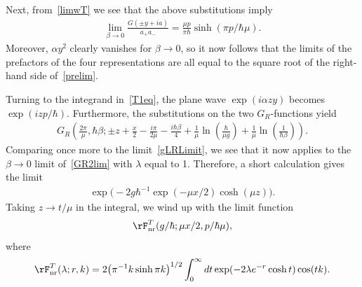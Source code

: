\documentclass[pdftex]{sigma}
\numberwithin{equation}{section}
\begin{document}
Next, from~\eqref{limwT} we see that the above substitutions imply
\begin{gather}\label{prelim}
\lim_{\beta\to 0}\frac{G(\pm y+ia)}{a_+a_-}=\frac{\mu p}{\pi\hbar}\sinh(\pi p/\hbar\mu).
\end{gather}
Moreover, $\alpha y^2$ clearly vanishes for $\beta\to 0$, so it now follows that the limits of the prefactors of the four representations are all equal to the square root of the right-hand side of~\eqref{prelim}.

Turning to the integrand in~\eqref{T1eq}, the plane wave $\exp(i\alpha zy)$ becomes $\exp(izp/\hbar)$. Furthermore, the substitutions on the two $G_R$-functions yield
\begin{gather}\label{GR2lim}
G_R\left(\frac{2\pi}{\mu},\hbar\beta;\pm z +\frac{x}{2}-\frac{i\pi}{2\mu}-\frac{i\hbar\beta}{4}+\frac{1}{\mu}\ln\left(\frac{\hbar}{\mu g}\right)
+\frac{1}{\mu}\ln\left(\frac{1}{\hbar\beta}\right)\right).
\end{gather}
Comparing once more to the limit~\eqref{gLRLimit}, we see that it now applies to the $\beta\to 0$ limit of~\eqref{GR2lim} with $\lambda$ equal to 1. Therefore, a short calculation gives the limit
\begin{gather}
\exp\big({-}2g\hbar^{-1}\exp(-\mu x/2)\cosh (\mu z)\big).
\end{gather}
Taking $z\to t/\mu$ in the integral, we wind up with the limit function
\begin{gather}\label{FnrT}
\rF_{\rm nr}^T(g/\hbar;\mu x/2,p/\hbar\mu),
\end{gather}
where
\begin{gather}\label{FnrT1}
\rF_{\rm nr}^T(\lambda;r,k)=2\big(\pi^{-1}k\sinh \pi k\big)^{1/2}
\int_0^{\infty} dt \exp(-2\lambda e^{-r}\cosh t)\cos(tk).
\end{gather}
\end{document}
